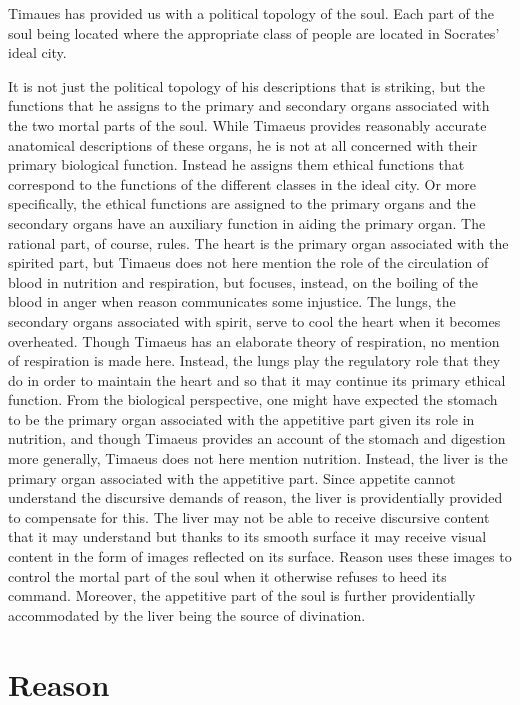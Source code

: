 Timaues has provided us with a political topology of the soul. Each part of the soul being located where the appropriate class of people are located in Socrates' ideal city.

It is not just the political topology of his descriptions that is striking, but the functions that he assigns to the primary and secondary organs associated with the two mortal parts of the soul. While Timaeus provides reasonably accurate anatomical descriptions of these organs, he is not at all concerned with their primary biological function. Instead he assigns them ethical functions that correspond to the functions of the different classes in the ideal city. Or more specifically, the ethical functions are assigned to the primary organs and the secondary organs have an auxiliary function in aiding the primary organ. The rational part, of course, rules. The heart is the primary organ associated with the spirited part, but Timaeus does not here mention the role of the circulation of blood in nutrition and respiration, but focuses, instead, on the boiling of the blood in anger when reason communicates some injustice. The lungs, the secondary organs associated with spirit, serve to cool the heart when it becomes overheated. Though Timaeus has an elaborate theory of respiration, no mention of respiration is made here. Instead, the lungs play the regulatory role that they do in order to maintain the heart and so that it may continue its primary ethical function. From the biological perspective, one might have expected the stomach to be the primary organ associated with the appetitive part given its role in nutrition, and though Timaeus provides an account of the stomach and digestion more generally, Timaeus does not here mention nutrition. Instead, the liver is the primary organ associated with the appetitive part. Since appetite cannot understand the discursive demands of reason, the liver is providentially provided to compensate for this. The liver may not be able to receive discursive content that it may understand but thanks to its smooth surface it may receive visual content in the form of images reflected on its surface. Reason uses these images to control the mortal part of the soul when it otherwise refuses to heed its command. Moreover, the appetitive part of the soul is further providentially accommodated by the liver being the source of divination.



\section{Reason} %
\label{sec:reason}

